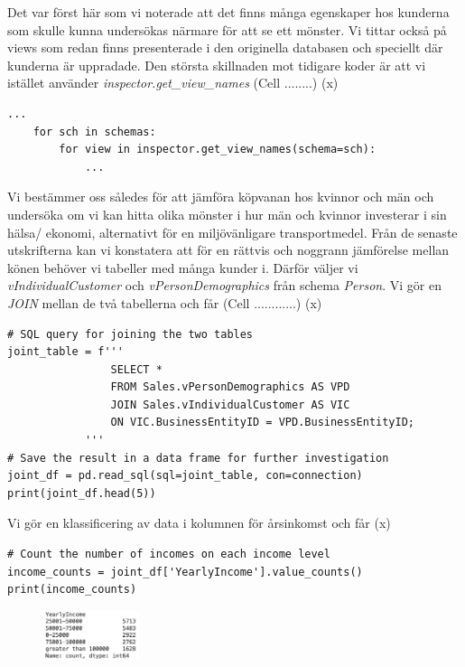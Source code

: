\documentclass[]{article}
\begin{document}
Det var först här som vi noterade att det finns många egenskaper hos kunderna som skulle kunna undersökas närmare för att se ett mönster. Vi tittar också på views som redan finns presenterade i den originella databasen och speciellt där kunderna är uppradade. Den största skillnaden mot tidigare koder är att vi istället använder \emph{inspector.get\_view\_names} (Cell ........)
\if(x)
\begin{lstlisting}
...
    for sch in schemas:
        for view in inspector.get_view_names(schema=sch):
            ...
\end{lstlisting}
\fi

Vi bestämmer oss således för att jämföra köpvanan hos kvinnor och män och undersöka om vi kan hitta olika mönster i hur män och kvinnor investerar i sin hälsa/ ekonomi, alternativt för en miljövänligare transportmedel. Från de senaste utskrifterna kan vi konstatera att för en rättvis och noggrann jämförelse mellan könen behöver vi tabeller med många kunder i. Därför väljer vi \emph{vIndividualCustomer} och \emph{vPersonDemographics} från schema \emph{Person}. Vi gör en \emph{JOIN} mellan de två tabellerna och får (Cell ............)
\if(x)
\begin{lstlisting}
# SQL query for joining the two tables
joint_table = f'''
                SELECT *
                FROM Sales.vPersonDemographics AS VPD
                JOIN Sales.vIndividualCustomer AS VIC
                ON VIC.BusinessEntityID = VPD.BusinessEntityID;
            '''
# Save the result in a data frame for further investigation
joint_df = pd.read_sql(sql=joint_table, con=connection)
print(joint_df.head(5))
\end{lstlisting}
\fi

Vi gör en klassificering av data i kolumnen för årsinkomst och får
\if(x)
\begin{lstlisting}
# Count the number of incomes on each income level
income_counts = joint_df['YearlyIncome'].value_counts()
print(income_counts)
\end{lstlisting}
\fi

\begin{figure}[h]
    \centering
    \includegraphics[width=0.25\textwidth]{img_yearly_income.png}
\end{figure}
\end{document}
